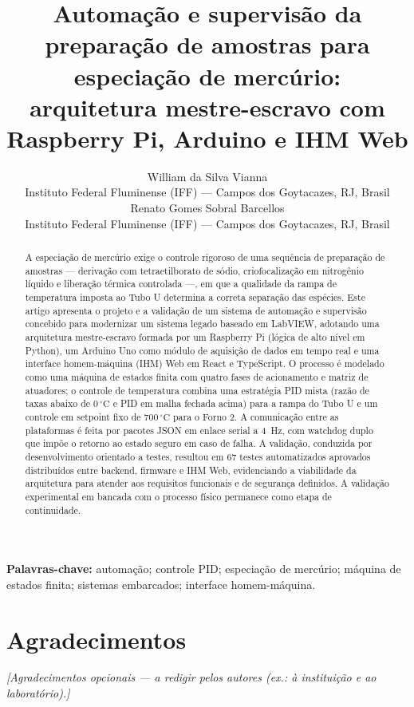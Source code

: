 \documentclass[11pt,a4paper]{article}
\title{Automa\c{c}\~ao e supervis\~ao da prepara\c{c}\~ao de amostras para
especia\c{c}\~ao de merc\'urio: arquitetura mestre-escravo com Raspberry Pi,
Arduino e IHM Web}
\author{
William da Silva Vianna \\
\small Instituto Federal Fluminense (IFF) --- Campos dos Goytacazes, RJ, Brasil
\\[1.2em]
Renato Gomes Sobral Barcellos \\
\small Instituto Federal Fluminense (IFF) --- Campos dos Goytacazes, RJ, Brasil
}
\date{}
\newcommand{\celsius}{\ensuremath{^{\circ}\mathrm{C}}}
\begin{document}
\maketitle

\begin{abstract}
\noindent A especia\c{c}\~ao de merc\'urio exige o controle rigoroso de uma
sequ\^encia de prepara\c{c}\~ao de amostras --- deriva\c{c}\~ao com
tetraetilborato de s\'odio, criofocaliza\c{c}\~ao em nitrog\^enio l\'iquido e
libera\c{c}\~ao t\'ermica controlada ---, em que a qualidade da rampa de
temperatura imposta ao Tubo U determina a correta separa\c{c}\~ao das esp\'ecies.
Este artigo apresenta o projeto e a valida\c{c}\~ao de um sistema de automa\c{c}\~ao
e supervis\~ao concebido para modernizar um sistema legado baseado em LabVIEW,
adotando uma arquitetura mestre-escravo formada por um Raspberry Pi (l\'ogica de
alto n\'ivel em Python), um Arduino Uno como m\'odulo de aquisi\c{c}\~ao de dados
em tempo real e uma interface homem-m\'aquina (IHM) Web em React e TypeScript. O
processo \'e modelado como uma m\'aquina de estados finita com quatro fases de
acionamento e matriz de atuadores; o controle de temperatura combina uma
estrat\'egia PID mista (raz\~ao de taxas abaixo de $0\,\celsius$ e PID em malha
fechada acima) para a rampa do Tubo U e um controle em setpoint fixo de
$700\,\celsius$ para o Forno 2. A comunica\c{c}\~ao entre as plataformas \'e feita
por pacotes JSON em enlace serial a 4~Hz, com watchdog duplo que imp\~oe o retorno
ao estado seguro em caso de falha. A valida\c{c}\~ao, conduzida por
desenvolvimento orientado a testes, resultou em 67 testes automatizados
aprovados distribu\'idos entre backend, firmware e IHM Web, evidenciando a
viabilidade da arquitetura para atender aos requisitos funcionais e de
seguran\c{c}a definidos. A valida\c{c}\~ao experimental em bancada com o processo
f\'isico permanece como etapa de continuidade.
\end{abstract}

\vspace{0.5em}
\noindent\textbf{Palavras-chave:} automa\c{c}\~ao; controle PID; especia\c{c}\~ao
de merc\'urio; m\'aquina de estados finita; sistemas embarcados; interface
homem-m\'aquina.








\section*{Agradecimentos}
\textit{[Agradecimentos opcionais --- a redigir pelos autores (ex.: \`a
institui\c{c}\~ao e ao laborat\'orio).]}



\end{document}
